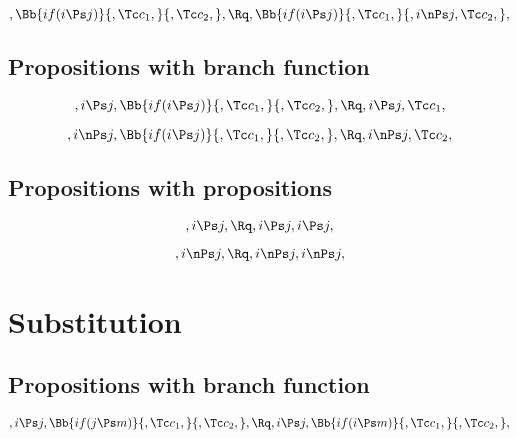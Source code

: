\[, \Bb{if(i \Ps j)}{,\Tc c_1,}{,\Tc c_2,}, \Rq , \Bb{if(i \Ps j)}{,\Tc c_1,}{,i \nPs j,\Tc c_2,},\]

\bigskip
\bigskip
\bigskip
\bigskip
\subsection{Propositions with branch function}
\[,i \Ps j, \Bb{if(i \Ps j)}{,\Tc c_1,}{,\Tc c_2,}, \Rq , i \Ps j, \Tc c_1,\]

\[,i \nPs j, \Bb{if(i \Ps j)}{,\Tc c_1,}{,\Tc c_2,}, \Rq , i \nPs j, \Tc c_2,\]
\bigskip
\bigskip
\bigskip
\bigskip
\subsection{Propositions with propositions}
\[,i \Ps j, \Rq , i \Ps j, i \Ps j,\]

\[,i \nPs j, \Rq , i \nPs j, i \nPs j,\]


\bigskip
\bigskip
\bigskip
\bigskip
\section{Substitution}
\subsection{Propositions with branch function}
\[,i \Ps j, \Bb{if(j \Ps m)}{,\Tc c_1,}{,\Tc c_2,}, \Rq ,i \Ps j, \Bb{if(i \Ps m)}{,\Tc c_1,}{,\Tc c_2,}, \]

